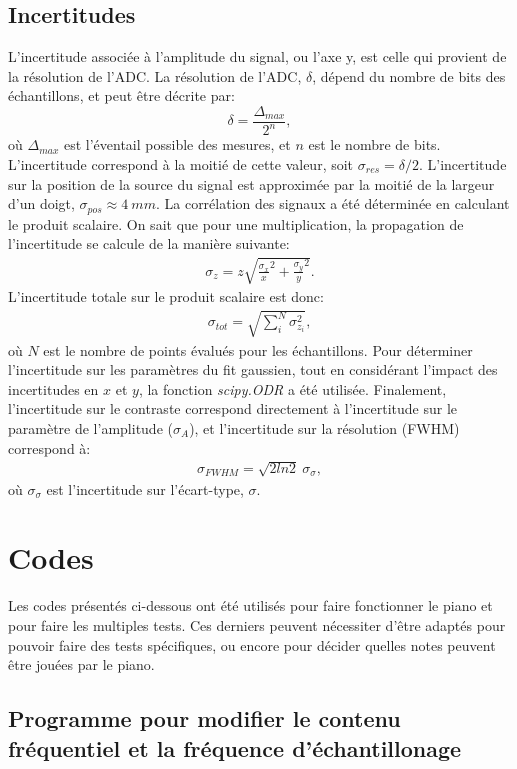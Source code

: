 \documentclass[11pt,letterpaper]{article}
\begin{document}
\subsection{Incertitudes}
L'incertitude associée à l'amplitude du signal, ou l'axe y, est celle qui provient de la résolution 
de l'ADC. La résolution de l'ADC, $\delta$, dépend du nombre de bits des échantillons, et peut être décrite par:
\[\delta=\frac{\Delta_{max}}{2^{n}},\]
où $\Delta_{max}$ est l'éventail possible des mesures, et $n$ est le nombre de bits. L'incertitude correspond
à la moitié de cette valeur, soit $\sigma_{res}=\delta/2$. L'incertitude sur la position de la source du signal
est approximée par la moitié de la largeur d'un doigt, $\sigma_{pos}\approx4\ mm$. La corrélation des signaux a été déterminée
en calculant le produit scalaire. On sait que pour une multiplication, la propagation de l'incertitude se calcule de la
manière suivante:
\begin{align*}
  \sigma_{z}=z \sqrt{\frac{\sigma_x}{x}^2+\frac{\sigma_y}{y}^2}.
\end{align*}
L'incertitude totale sur le produit scalaire est donc:
\begin{align*}
  \sigma_{tot}=\sqrt{\sum_i^{N} \sigma_{z_i}^2},
\end{align*}
où $N$ est le nombre de points évalués pour les échantillons. Pour déterminer l'incertitude sur les
paramètres du fit gaussien, tout en considérant l'impact des incertitudes en $x$ et $y$, la fonction \textit{scipy.ODR}
a été utilisée. Finalement, l'incertitude sur le contraste correspond directement à l'incertitude sur le paramètre de
l'amplitude ($\sigma_{A}$), et l'incertitude sur la résolution (FWHM) correspond à:
\begin{align*}
  \sigma_{FWHM}=\sqrt{2ln2}\ \sigma_{\sigma},
\end{align*}
où $\sigma_{\sigma}$ est l'incertitude sur l'écart-type, $\sigma$.



\section{Codes}

Les codes présentés ci-dessous ont été utilisés pour faire fonctionner le piano et pour faire les
multiples tests. Ces derniers peuvent nécessiter d'être adaptés pour pouvoir faire des tests
spécifiques, ou encore pour décider quelles notes peuvent être jouées par le piano.

\subsection{Programme pour modifier le contenu fréquentiel et la fréquence d'échantillonage}
\end{document}
